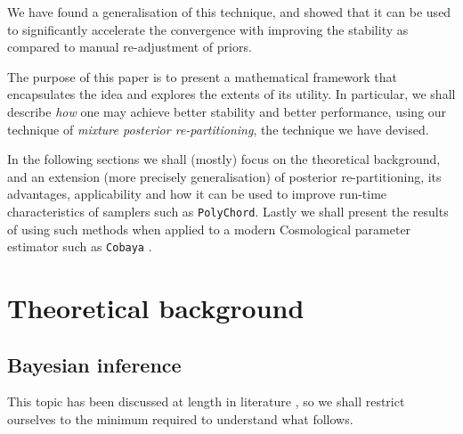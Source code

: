 \documentclass[usenatbib]{mnras}
\begin{document}
We have found a generalisation of this technique, and showed that it
can be used to significantly accelerate the convergence with
improving the stability as compared to manual re-adjustment of
priors.

The purpose of this paper is to present a mathematical framework
that encapsulates the idea and explores the extents of its
utility. In particular, we shall describe \emph{how} one may achieve
better stability and better performance, using our technique of
\emph{mixture posterior re-partitioning}, the technique we have devised.

In the following sections we shall (mostly) focus on the theoretical
background, and an extension (more precisely generalisation) of
posterior re-partitioning, its advantages, applicability and how it
can be used to improve run-time characteristics of samplers such as
\texttt{PolyChord}. Lastly we shall present the results of using such methods
when applied to a modern Cosmological parameter estimator such as
\texttt{Cobaya} \citep{cobaya}.

\section{Theoretical background}
\label{sec:orgc2658b9}

\subsection{Bayesian inference}
\label{sec:orgbf7f62a}

This topic has been discussed at length in literature
\citep{jeffreys2010scientific}, so we shall restrict ourselves to the
minimum required to understand what follows.
\end{document}
